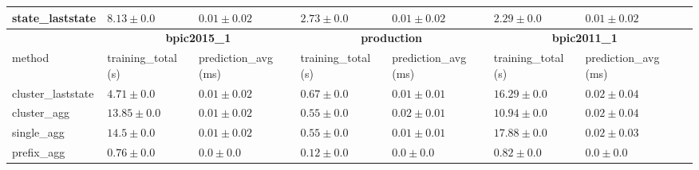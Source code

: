 \documentclass[twoside,11pt]{Latex/Classes/PhDthesisPSnPDF}
\begin{document}
\begin{table}[!htbp]
{\begin{tabular}{llllllll}
			state\_laststate & $8.13 \pm 0.0$ & $0.01 \pm 0.02$ & $2.73 \pm 0.0$ & $0.01 \pm 0.02$ & $2.29 \pm 0.0$ & $0.01 \pm 0.02$ \\ 
			\bottomrule
			\toprule
			& \multicolumn{2}{c}{{\bfseries bpic2015\_1}} & \multicolumn{2}{c}{{\bfseries production}} & \multicolumn{2}{c}{{\bfseries bpic2011\_1}} \\ \cmidrule(lr){2-3} \cmidrule(lr){4-5} \cmidrule(lr){6-7}
			method  & training\_total (s) & prediction\_avg (ms) & training\_total (s) & prediction\_avg (ms) & training\_total (s) & prediction\_avg (ms) \\ \midrule
			cluster\_laststate & $4.71 \pm 0.0$ & $0.01 \pm 0.02$ & $0.67 \pm 0.0$ & $0.01 \pm 0.01$ & $16.29 \pm 0.0$ & $0.02 \pm 0.04$ \\ 
			cluster\_agg & $13.85 \pm 0.0$ & $0.01 \pm 0.02$ & $0.55 \pm 0.0$ & $0.02 \pm 0.01$ & $10.94 \pm 0.0$ & $0.02 \pm 0.04$ \\ 
			single\_agg & $14.5 \pm 0.0$ & $0.01 \pm 0.02$ & $0.55 \pm 0.0$ & $0.01 \pm 0.01$ & $17.88 \pm 0.0$ & $0.02 \pm 0.03$ \\ 
			prefix\_agg & $0.76 \pm 0.0$ & $\mathbf{0.0 \pm 0.0}$ & $0.12 \pm 0.0$ & $\mathbf{0.0 \pm 0.0}$ & $0.82 \pm 0.0$ & $\mathbf{0.0 \pm 0.0}$ \\ 
			

\end{tabular}}
\end{table}
\end{document}
